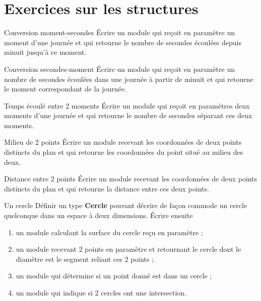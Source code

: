 	\section{Exercices sur les structures}
	
		\begin{Exercice}{Conversion moment-secondes}
			Écrire un module qui reçoit en paramètre un
			moment d’une journée et qui retourne le nombre de secondes écoulées
			depuis minuit jusqu’à ce moment.
		\end{Exercice}
		
		\begin{Exercice}{Conversion secondes-moment}
			Écrire un module qui reçoit en paramètre un
			nombre de secondes écoulées dans une journée à partir de minuit et qui
			retourne le moment correspondant de la journée.
		\end{Exercice}
		
		\begin{Exercice}{Temps écoulé entre 2 moments}
			Écrire un module qui reçoit en paramètres deux
			moments d’une journée et qui retourne le nombre de secondes séparant
			ces deux moments.
		\end{Exercice}
		
		\begin{Exercice}{Milieu de 2 points}
			Écrire un module recevant les coordonnées de
			deux points distincts du plan et qui retourne les coordonnées du point
			situé au milieu des deux.
		\end{Exercice}
		
		\begin{Exercice}{Distance entre 2 points}
			Écrire un module recevant les coordonnées de
			deux points distincts du plan et qui retourne
			la distance entre ces deux points.
		\end{Exercice}
		
		\begin{Exercice}{Un cercle}
			Définir un type \textbf{Cercle} pouvant décrire de façon
			commode un cercle quelconque dans un espace à deux dimensions. 	
			Écrire ensuite
			
			\begin{enumerate}[label=\alph*)]
			\item {
				un module calculant la surface du cercle reçu en paramètre ;}
			\item {
				un module recevant 2 points en paramètre et retournant le cercle dont le
				diamètre est le segment reliant ces 2 points ;}
			\item {
				un module qui détermine si un point donné est dans un cercle ;}
			\item {
				un module qui indique si 2 cercles ont une intersection.
			}
			\end{enumerate}
		\end{Exercice}
		
